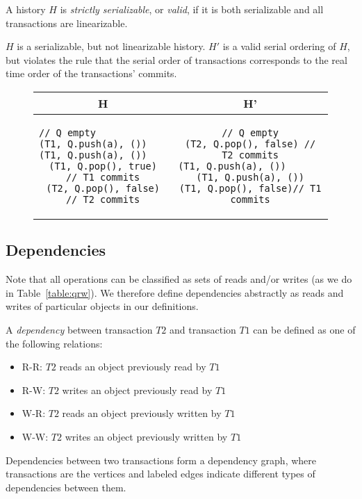 \begin{defn}
    A history $H$ is \emph{strictly serializable}, or \emph{valid}, if it is both serializable and all transactions are linearizable. 
\end{defn}

\begin{eg}
$H$ is a serializable, but not linearizable history. $H'$ is a valid serial ordering of $H$, but violates the rule that the serial order of transactions corresponds to the real time order of the transactions' commits.
    
\begin{figure}[H]
\singlespacing   
    \begin{tabular}{c|c}
H & H'\\
\hline
\begin{lstlisting}
// Q empty                          
(T1, Q.push(a), ())                
(T1, Q.push(a), ())               
(T1, Q.pop(), true)  // T1 commits
(T2, Q.pop(), false) // T2 commits
\end{lstlisting} & 
\begin{lstlisting}
// Q empty
(T2, Q.pop(), false) // T2 commits
(T1, Q.push(a), ())                       
(T1, Q.push(a), ())
(T1, Q.pop(), false)// T1 commits
\end{lstlisting}
    \end{tabular}
\end{figure}
\end{eg}

\subsection{Dependencies}

Note that all operations can be classified as sets of reads and/or writes (as we do in Table~\ref{table:qrw}). We therefore define dependencies abstractly as reads and writes of particular objects in our definitions.

\begin{defn}
    A \emph{dependency} between transaction $T2$ and transaction $T1$ can be defined as one of the following relations:
    \begin{itemize}
        \item R-R: $T2$ reads an object previously read by $T1$
        \item R-W: $T2$ writes an object previously read by $T1$
        \item W-R: $T2$ reads an object previously written by $T1$
        \item W-W: $T2$ writes an object previously written by $T1$
    \end{itemize}
    Dependencies between two transactions form a dependency graph, where transactions are the vertices and labeled edges indicate different types of dependencies between them.
\end{defn}

